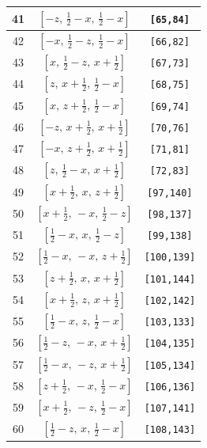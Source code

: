 \documentclass[fleqn,8pt]{jsarticle}
\begin{document}
\begin{longtable}{ccc}
41 & $\left[ - z,\, \frac{1}{2} - x,\, \frac{1}{2} - x \right]$ & {\tt [65,84]} \\ \hline
42 & $\left[ - x,\, \frac{1}{2} - z,\, \frac{1}{2} - x \right]$ & {\tt [66,82]} \\ \hline
43 & $\left[ x,\, \frac{1}{2} - z,\, x + \frac{1}{2} \right]$ & {\tt [67,73]} \\ \hline
44 & $\left[ z,\, x + \frac{1}{2},\, \frac{1}{2} - x \right]$ & {\tt [68,75]} \\ \hline
45 & $\left[ x,\, z + \frac{1}{2},\, \frac{1}{2} - x \right]$ & {\tt [69,74]} \\ \hline
46 & $\left[ - z,\, x + \frac{1}{2},\, x + \frac{1}{2} \right]$ & {\tt [70,76]} \\ \hline
47 & $\left[ - x,\, z + \frac{1}{2},\, x + \frac{1}{2} \right]$ & {\tt [71,81]} \\ \hline
48 & $\left[ z,\, \frac{1}{2} - x,\, x + \frac{1}{2} \right]$ & {\tt [72,83]} \\ \hline
49 & $\left[ x + \frac{1}{2},\, x,\, z + \frac{1}{2} \right]$ & {\tt [97,140]} \\ \hline
50 & $\left[ x + \frac{1}{2},\, - x,\, \frac{1}{2} - z \right]$ & {\tt [98,137]} \\ \hline
51 & $\left[ \frac{1}{2} - x,\, x,\, \frac{1}{2} - z \right]$ & {\tt [99,138]} \\ \hline
52 & $\left[ \frac{1}{2} - x,\, - x,\, z + \frac{1}{2} \right]$ & {\tt [100,139]} \\ \hline
53 & $\left[ z + \frac{1}{2},\, x,\, x + \frac{1}{2} \right]$ & {\tt [101,144]} \\ \hline
54 & $\left[ x + \frac{1}{2},\, z,\, x + \frac{1}{2} \right]$ & {\tt [102,142]} \\ \hline
55 & $\left[ \frac{1}{2} - x,\, z,\, \frac{1}{2} - x \right]$ & {\tt [103,133]} \\ \hline
56 & $\left[ \frac{1}{2} - z,\, - x,\, x + \frac{1}{2} \right]$ & {\tt [104,135]} \\ \hline
57 & $\left[ \frac{1}{2} - x,\, - z,\, x + \frac{1}{2} \right]$ & {\tt [105,134]} \\ \hline
58 & $\left[ z + \frac{1}{2},\, - x,\, \frac{1}{2} - x \right]$ & {\tt [106,136]} \\ \hline
59 & $\left[ x + \frac{1}{2},\, - z,\, \frac{1}{2} - x \right]$ & {\tt [107,141]} \\ \hline
60 & $\left[ \frac{1}{2} - z,\, x,\, \frac{1}{2} - x \right]$ & {\tt [108,143]} \\ \hline

\end{longtable}
\end{document}
